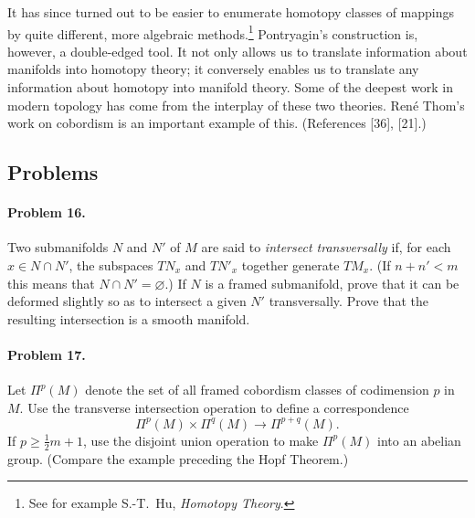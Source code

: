 It has since turned out to be easier to enumerate homotopy classes of mappings by quite different, more algebraic methods.\footnote{See for example S.-T.~Hu, \emph{Homotopy Theory}.} Pontryagin's construction is, however, a double-edged tool. It not only allows us to translate information about manifolds into homotopy theory; it conversely enables us to translate any information about homotopy into manifold theory. Some of the deepest work in modern topology has come from the interplay of these two theories. Ren\'e Thom's work on cobordism is an important example of this. (References [36], [21].)

\subsection*{Problems}

\paragraph{Problem 16.}
Two submanifolds $N$ and $N'$ of $M$ are said to \emph{intersect transversally} if, for each $x \in N \cap N'$, the subspaces $TN_x$ and $TN'_x$ together generate $TM_x$. (If $n + n' < m$ this means that $N \cap N' = \varnothing$.) If $N$ is a framed submanifold, prove that it can be deformed slightly so as to intersect a given $N'$ transversally. Prove that the resulting intersection is a smooth manifold.

\paragraph{Problem 17.}
Let $\Pi^p(M)$ denote the set of all framed cobordism classes of codimension $p$ in $M$. Use the transverse intersection operation to define a correspondence
\[
\Pi^p(M) \times \Pi^q(M) \to \Pi^{p+q}(M).
\]
If $p \ge \frac{1}{2} m + 1$, use the disjoint union operation to make $\Pi^p(M)$ into an abelian group. (Compare the example preceding the Hopf Theorem.)

